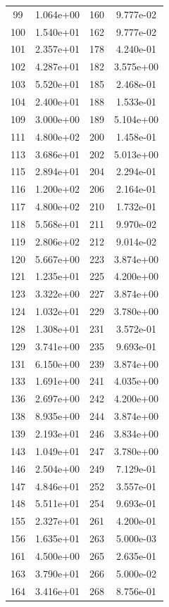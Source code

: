 \documentclass[12pt]{article}
\begin{document}
\begin{longtable}{@{}cccc@{}}
99 & 1.064e+00 & 160 & 9.777e-02 \\
100 & 1.540e+01 & 162 & 9.777e-02 \\
101 & 2.357e+01 & 178 & 4.240e-01 \\
102 & 4.287e+01 & 182 & 3.575e+00 \\
103 & 5.520e+01 & 185 & 2.468e-01 \\
104 & 2.400e+01 & 188 & 1.533e-01 \\
109 & 3.000e+00 & 189 & 5.104e+00 \\
111 & 4.800e+02 & 200 & 1.458e-01 \\
113 & 3.686e+01 & 202 & 5.013e+00 \\
115 & 2.894e+01 & 204 & 2.294e-01 \\
116 & 1.200e+02 & 206 & 2.164e-01 \\
117 & 4.800e+02 & 210 & 1.732e-01 \\
118 & 5.568e+01 & 211 & 9.970e-02 \\
119 & 2.806e+02 & 212 & 9.014e-02 \\
120 & 5.667e+00 & 223 & 3.874e+00 \\
121 & 1.235e+01 & 225 & 4.200e+00 \\
123 & 3.322e+00 & 227 & 3.874e+00 \\
124 & 1.032e+01 & 229 & 3.780e+00 \\
128 & 1.308e+01 & 231 & 3.572e-01 \\
129 & 3.741e+00 & 235 & 9.693e-01 \\
131 & 6.150e+00 & 239 & 3.874e+00 \\
133 & 1.691e+00 & 241 & 4.035e+00 \\
136 & 2.697e+00 & 242 & 4.200e+00 \\
138 & 8.935e+00 & 244 & 3.874e+00 \\
139 & 2.193e+01 & 246 & 3.834e+00 \\
143 & 1.049e+01 & 247 & 3.780e+00 \\
146 & 2.504e+00 & 249 & 7.129e-01 \\
147 & 4.846e+01 & 252 & 3.557e-01 \\
148 & 5.511e+01 & 254 & 9.693e-01 \\
155 & 2.327e+01 & 261 & 4.200e-01 \\
156 & 1.635e+01 & 263 & 5.000e-03 \\
161 & 4.500e+00 & 265 & 2.635e-01 \\
163 & 3.790e+01 & 266 & 5.000e-02 \\
164 & 3.416e+01 & 268 & 8.756e-01 \\

\end{longtable}
\end{document}
